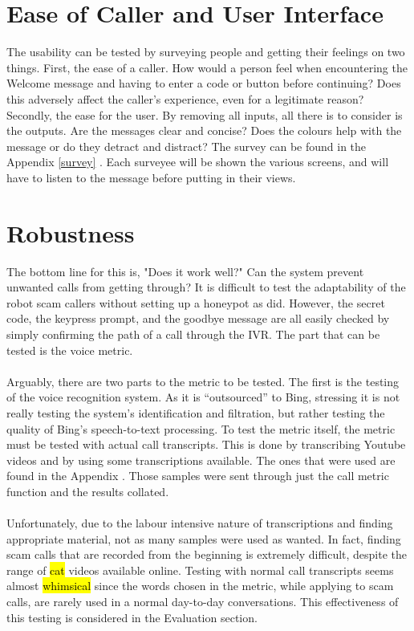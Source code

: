 \documentclass[main.tex]{subfiles}
\begin{document}
\section{Ease of Caller and User Interface}
The usability can be tested by surveying people and getting their feelings on two things. First, the ease of a caller. How would a person feel when encountering the Welcome message and having to enter a code or button before continuing? Does this adversely affect the caller's experience, even for a legitimate reason? Secondly, the ease for the user. By removing all inputs, all there is to consider is the outputs. Are the messages clear and concise? Does the colours help with the message or do they detract and distract? The survey can be found in the Appendix \ref{survey} . Each surveyee will be shown the various screens, and will have to listen to the message before putting in their views.

\section{Robustness}
The bottom line for this is, "Does it work well?" Can the system prevent unwanted calls from getting through? It is difficult to test the adaptability of the robot scam callers without setting up a honeypot as  did. However, the secret code, the keypress prompt, and the goodbye message are all easily checked by simply confirming the path of a call through the IVR. The part that can be tested is the voice metric.
\\\\
Arguably, there are two parts to the metric to be tested. The first is the testing of the voice recognition system. As it is ``outsourced'' to Bing, stressing it is not really testing the system's identification and filtration, but rather testing the quality of Bing's speech-to-text processing. To test the metric itself, the metric must be tested with actual call transcripts. This is done by transcribing Youtube videos and by using some transcriptions available. The ones that were used are found in the Appendix . Those samples were sent through just the call metric function and the results collated.
\\\\
Unfortunately, due to the labour intensive nature of transcriptions and finding appropriate material, not as many samples were used as wanted. In fact, finding scam calls that are recorded from the beginning is extremely difficult, despite the range of \hl{cat} videos available online. Testing with normal call transcripts seems almost \hl{whimsical} since the words chosen in the metric, while applying to scam calls, are rarely used in a normal day-to-day conversations. This effectiveness of this testing is considered in the Evaluation section.
\end{document}
